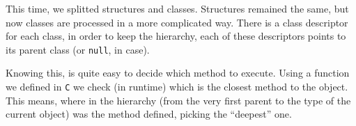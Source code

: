 \documentclass{article}
\begin{document}
This time, we splitted structures and classes. Structures remained the same, but now classes are processed in a more complicated way. There is a class descriptor for each class, in order to keep the hierarchy, each of these descriptors points to its parent class (or \texttt{null}, in case).

Knowing this, is quite easy to decide which method to execute. Using a function we defined in \texttt{C} we check (in runtime) which is the closest method to the object. This means, where in the hierarchy (from the very first parent to the type of the current object) was the method defined, picking the ``deepest'' one.
\end{document}
